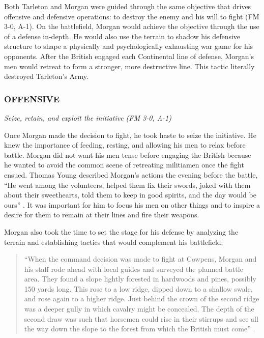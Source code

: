 Both Tarleton and Morgan were guided through the same objective that drives
offensive and defensive operations: to destroy the enemy and his will to fight
(FM 3-0, A-1).  On the battlefield, Morgan would achieve the objective through
the use of a defense in-depth.  He would also use the terrain to shadow his
defensive structure to shape a physically and psychologically exhausting war
game for his opponents.  After the British engaged each Continental line of
defense, Morgan’s men would retreat to form a stronger, more destructive line.
This tactic literally destroyed Tarleton’s Army.  

\subsubsection{OFFENSIVE}

\textit{Seize, retain, and exploit the initiative (FM 3-0, A-1)}

Once Morgan made the decision to fight, he took haste to seize the initiative.
He knew the importance of feeding, resting, and allowing his men to relax
before battle.  Morgan did not want his men tense before engaging the British
because he wanted to avoid the common scene of retreating militiamen once the
fight ensued.  Thomas Young described Morgan’s actions the evening before the
battle, “He went among the volunteers, helped them fix their swords, joked with
them about their sweethearts, told them to keep in good spirits, and the day
would be ours” \cite[p.318]{buchanan_road_1997}.   It was important for him to focus his men
on other things and to inspire a desire for them to remain at their lines and
fire their weapons.  

Morgan also took the time to set the stage for his defense by analyzing the
terrain and establishing tactics that would complement his battlefield:

\begin{quote}
“When the command decision was made to fight at Cowpens, Morgan and his staff
rode ahead with local guides and surveyed the planned battle area.  They found
a slope lightly forested in hardwoods and pines, possibly 150 yards long.  This
rose to a low ridge, dipped down to a shallow swale, and rose again to a higher
ridge.  Just behind the crown of the second ridge was a deeper gully in which
cavalry might be concealed.  The depth of the second draw was such that
horsemen could rise in their stirrups and see all the way down the slope to the
forest from which the British must come” \cite[p.126]{lumpkin_savannah_1981}. 
\end{quote}

